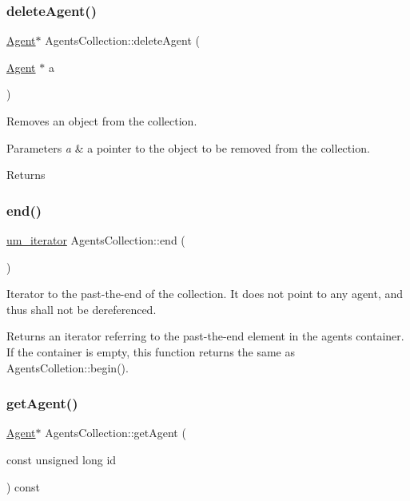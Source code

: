 \subsubsection{\texorpdfstring{delete\+Agent()}{deleteAgent()}}
{\footnotesize\ttfamily \hyperlink{class_agent}{Agent}$\ast$ Agents\+Collection\+::delete\+Agent (\begin{DoxyParamCaption}\item[{\hyperlink{class_agent}{Agent} $\ast$}]{a }\end{DoxyParamCaption})}

Removes an object from the collection. 
\begin{DoxyParams}{Parameters}
{\em a} & a pointer to the object to be removed from the collection. \\
\hline
\end{DoxyParams}
\begin{DoxyReturn}{Returns}

\end{DoxyReturn}
\mbox{\label{class_agents_collection_afc61b751cf3387ab4a1bf0dfbc29cb82}} 
\subsubsection{\texorpdfstring{end()}{end()}}
{\footnotesize\ttfamily \hyperlink{_agents_collection_8h_afde47bc45d604b8b8c72755072376679}{um\+\_\+iterator} Agents\+Collection\+::end (\begin{DoxyParamCaption}{ }\end{DoxyParamCaption})}

Iterator to the past-\/the-\/end of the collection. It does not point to any agent, and thus shall not be dereferenced. \begin{DoxyReturn}{Returns}
an iterator referring to the past-\/the-\/end element in the agents container. If the container is empty, this function returns the same as Agents\+Colletion\+::begin(). 
\end{DoxyReturn}
\mbox{\label{class_agents_collection_a4b6b57c50d715edb3404520cfdb32688}} 
\subsubsection{\texorpdfstring{get\+Agent()}{getAgent()}}
{\footnotesize\ttfamily \hyperlink{class_agent}{Agent}$\ast$ Agents\+Collection\+::get\+Agent (\begin{DoxyParamCaption}\item[{const unsigned long}]{id }\end{DoxyParamCaption}) const}

